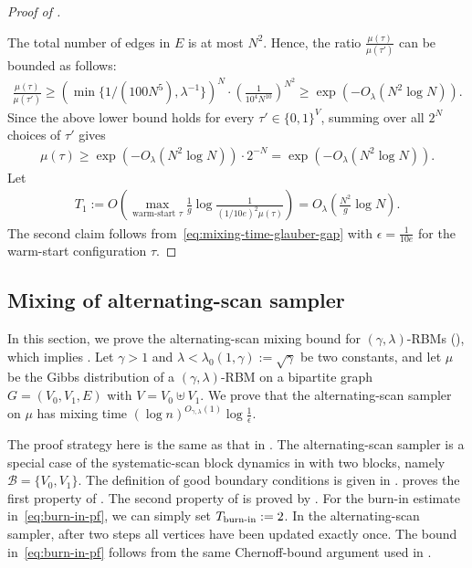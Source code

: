 \documentclass[11pt]{amsart}
\newcommand{\tp}[1]{{\left( #1 \right)}}
\def\+#1{\mathcal{#1}}
\newcommand{\defeq}{:=}
\theoremstyle{definition}
\theoremstyle{remark}
\begin{document}
\begin{proof}[Proof of ]
\begin{itemize}
\end{itemize}
The total number of edges in $E$ is at most $N^2$. Hence, the ratio $\frac{\mu(\tau)}{\mu(\tau')}$ can be bounded as follows:
\begin{align*}
\frac{\mu(\tau)}{\mu(\tau')} \geq \tp{\min\{1/(100N^5),\lambda^{-1}\}}^{N} \cdot \tp{\frac{1}{10^4 N^{10}}}^{N^2} \geq \exp(-O_\lambda(N^2 \log N)).
\end{align*}
Since the above lower bound holds for every $\tau' \in \{0,1\}^V$, summing over all $2^N$ choices of $\tau'$ gives
\begin{align}\label{eq:mu-tau-lower-bound}
 \mu(\tau) \geq \exp(-O_\lambda(N^2 \log N)) \cdot 2^{-N} = \exp(-O_\lambda(N^2 \log N)).
\end{align}
Let
\begin{align*}
 T_1 \defeq O\left( \max_{\text{warm-start } \tau} \frac{1}{g} \log \frac{1}{(1/10e)^2 \mu(\tau)}\right) = O_\lambda\tp{\frac{N^2}{g} \log N}.
\end{align*}
The second claim follows from~\eqref{eq:mixing-time-glauber-gap} with $\epsilon = \frac{1}{10e}$ for the warm-start configuration $\tau$.
\end{proof}

\subsection{Mixing of alternating-scan sampler}\label{sec:alternating-scan-proof}
In this section, we prove the alternating-scan mixing bound for $(\gamma,\lambda)$-RBMs (), which implies . Let $\gamma > 1$ and $\lambda < \lambda_0(1,\gamma) \defeq \sqrt{\gamma}$ be two constants, and let $\mu$ be the Gibbs distribution of a $(\gamma,\lambda)$-RBM on a bipartite graph $G=(V_0,V_1,E)$ with $V = V_0 \uplus V_1$. We prove that the alternating-scan sampler on $\mu$ has mixing time $(\log n)^{O_{\gamma,\lambda}(1)} \log \frac{1}{\epsilon}$.

The proof strategy here is the same as that in .
The alternating-scan sampler is a special case of the systematic-scan block dynamics in  with two blocks, namely $\+B = \{V_0,V_1\}$. 
The definition of good boundary conditions is given in . 
 proves the first property of . The second property of  is proved by . 
For the burn-in estimate in~\eqref{eq:burn-in-pf}, we can simply set $T_{\textnormal{burn-in}} \defeq 2$. 
In the alternating-scan sampler, after two steps all vertices have been updated exactly once. The bound in~\eqref{eq:burn-in-pf} follows from the same Chernoff-bound argument used in .
\end{document}
